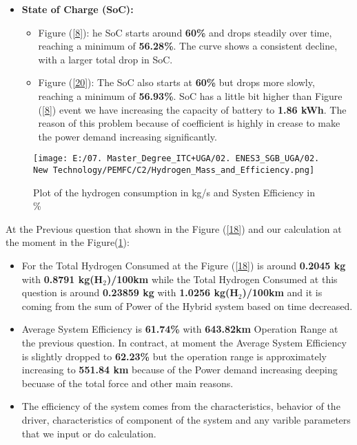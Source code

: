 \documentclass[12pt,a4paper]{article}
\numberwithin{equation}{section}
\begin{document}
\begin{itemize}
		\item \textbf{State of Charge (SoC):}
	\begin{itemize}
		\item {Figure (\ref{8}):} he SoC starts around \textbf{60\%} and drops steadily over time, reaching a minimum of \textbf{56.28\%}. The curve shows a consistent decline, with a larger total drop in SoC.
		\item {Figure (\ref{20}):} The SoC also starts at \textbf{60\%} but drops more slowly, reaching a minimum of \textbf{56.93\%}. SoC has a little bit higher than Figure (\ref{8}) event we have increasing the capacity of battery to \textbf{1.86 kWh}. The reason of this problem because of coefficient is highly in crease to make the power demand increasing significantly.
	\end{itemize}
\end{itemize}


\begin{figure}[h]
	\centering 
	\texttt{[image: E:/07. Master\_Degree\_ITC+UGA/02. ENES3\_SGB\_UGA/02. New Technology/PEMFC/C2/Hydrogen\_Mass\_and\_Efficiency.png]}
	\caption{\small {Plot of the hydrogen consumption in kg/s and Systen Efficiency in \%}}
	\label{24}
\end{figure}


At the Previous question that shown in the Figure (\ref{18}) and our calculation at the moment in the Figure(\ref{24}):
\begin{itemize}
	\item For the Total Hydrogen Consumed at the Figure (\ref{18}) is around \textbf{0.2045 kg} with \textbf{0.8791 kg(H$_2$)/100km} while the Total Hydrogen Consumed at this question is around \textbf{0.23859 kg} with \textbf{1.0256 kg(H$_2$)/100km} and it is coming from the sum of Power of the Hybrid system based on time decreased.
	
	\item Average System Efficiency is \textbf{61.74\%} with \textbf{643.82km} Operation Range at the previous question. In contract, at moment the Average System Efficiency is slightly dropped to \textbf{62.23\%} but the operation range is approximately increasing to \textbf{551.84 km} because of the Power demand increasing deeping becuase of the total force and other main reasons.
	\item The efficiency of the system comes from the characteristics, behavior of the driver, characteristics of component of the system and any varible parameters that we input or do calculation.

\end{itemize}
\end{document}
